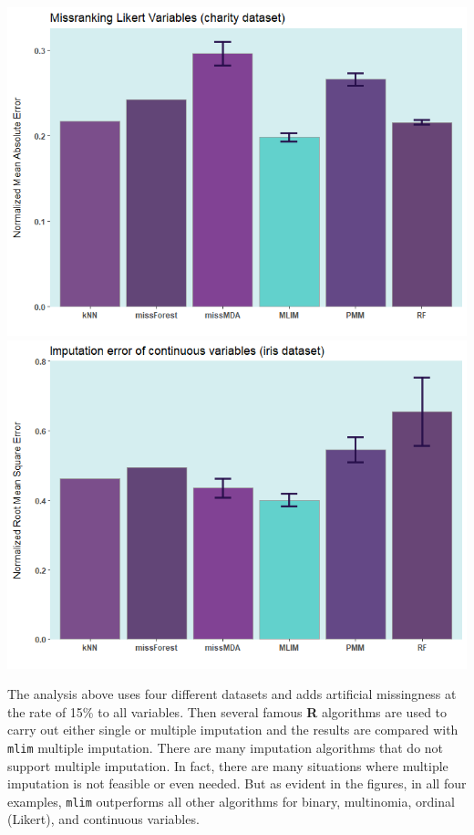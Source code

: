 \hspace{-30pt}\includegraphics[scale=.4]{figures/charity.png}
\includegraphics[scale=.4]{figures/iris_continuous_p15.png}

The analysis above uses four different datasets and adds artificial missingness at the rate of 15\% to all variables. Then several famous \textbf{R} algorithms are used to carry out either single or multiple imputation and the results are compared with \texttt{mlim} multiple imputation. There are many imputation algorithms that do not support multiple imputation. In fact, there are many situations where multiple imputation is not feasible or even needed. But as evident in the figures, in all four examples, \texttt{mlim} outperforms all other algorithms for binary, multinomia, ordinal (Likert), and continuous variables.  

